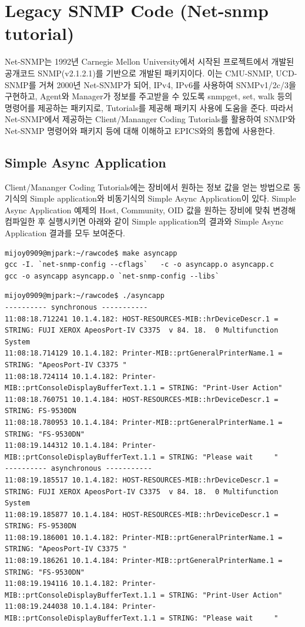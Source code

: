 \documentclass[11pt
  , a4paper
  , article
  , oneside
]{memoir}
\begin{document}
\section{Legacy SNMP Code (Net-snmp tutorial)}
Net-SNMP는 1992년 Carnegie Mellon University에서 시작된 프로젝트에서 개발된 공개코드 SNMP(v2.1.2.1)를 기반으로 개발된 패키지이다. 이는 CMU-SNMP, UCD-SNMP를 거쳐 2000년 Net-SNMP가 되어, IPv4, IPv6를 사용하여 SNMPv1/2c/3을 구현하고, Agent와 Manager가 정보를 주고받을 수 있도록 snmpget, set, walk 등의 명령어를 제공하는 패키지로, Tutorials를 제공해 패키지 사용에 도움을 준다\citep{netsnmp}\citep{tutorials}. 따라서 Net-SNMP에서 제공하는 Client/Mananger Coding Tutorials를 활용하여 SNMP와 Net-SNMP 명령어와 패키지 등에 대해 이해하고 EPICS와의 통합에 사용한다. 
 
\subsection{Simple Async Application}
Client/Mananger Coding Tutorials에는 장비에서 원하는 정보 값을 얻는 방법으로 동기식의 Simple application와 비동기식의 Simple Async Application이 있다. 
Simple Async Application 예제의 Host, Community, OID 값을 원하는 장비에 맞춰 변경해 컴파일한 후 실행시키면 아래와 같이 Simple application의 결과와 Simple Async Application 결과를 모두 보여준다. 

\begin{lstlisting}[style=termstyle]
mijoy0909@mjpark:~/rawcode$ make asyncapp
gcc -I. `net-snmp-config --cflags`   -c -o asyncapp.o asyncapp.c
gcc -o asyncapp asyncapp.o `net-snmp-config --libs`
\end{lstlisting}

\begin{lstlisting}[style=termstylenumber]
mijoy0909@mjpark:~/rawcode$ ./asyncapp 
---------- synchronous -----------
11:08:18.712241 10.1.4.182: HOST-RESOURCES-MIB::hrDeviceDescr.1 = STRING: FUJI XEROX ApeosPort-IV C3375  v 84. 18.  0 Multifunction System
11:08:18.714129 10.1.4.182: Printer-MIB::prtGeneralPrinterName.1 = STRING: "ApeosPort-IV C3375 "
11:08:18.724114 10.1.4.182: Printer-MIB::prtConsoleDisplayBufferText.1.1 = STRING: "Print-User Action"
11:08:18.760751 10.1.4.184: HOST-RESOURCES-MIB::hrDeviceDescr.1 = STRING: FS-9530DN
11:08:18.780953 10.1.4.184: Printer-MIB::prtGeneralPrinterName.1 = STRING: "FS-9530DN"
11:08:19.144312 10.1.4.184: Printer-MIB::prtConsoleDisplayBufferText.1.1 = STRING: "Please wait     "
---------- asynchronous -----------
11:08:19.185517 10.1.4.182: HOST-RESOURCES-MIB::hrDeviceDescr.1 = STRING: FUJI XEROX ApeosPort-IV C3375  v 84. 18.  0 Multifunction System
11:08:19.185877 10.1.4.184: HOST-RESOURCES-MIB::hrDeviceDescr.1 = STRING: FS-9530DN
11:08:19.186001 10.1.4.182: Printer-MIB::prtGeneralPrinterName.1 = STRING: "ApeosPort-IV C3375 "
11:08:19.186261 10.1.4.184: Printer-MIB::prtGeneralPrinterName.1 = STRING: "FS-9530DN"
11:08:19.194116 10.1.4.182: Printer-MIB::prtConsoleDisplayBufferText.1.1 = STRING: "Print-User Action"
11:08:19.244038 10.1.4.184: Printer-MIB::prtConsoleDisplayBufferText.1.1 = STRING: "Please wait     "
\end{lstlisting}
\end{document}
